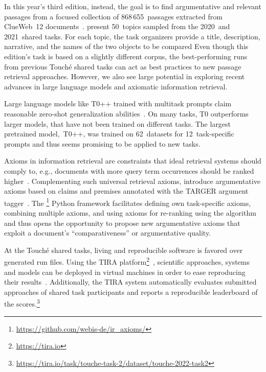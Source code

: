 In this year's third edition, instead, the goal is to find argumentative and relevant passages from a focused collection of 868\,655~passages extracted from ClueWeb~12 documents~\cite{BondarenkoFKSGBPBSWPH2022}.
\citeauthor{BondarenkoFKSGBPBSWPH2022} present 50~topics sampled from the 2020~and 2021~shared tasks. 
For each topic, the task organizers provide a title, description, narrative, and the names of the two objects to be compared
Even though this edition's task is based on a slightly different corpus, the best-performing runs from previous Touché shared tasks can act as best practices to new passage retrieval approaches.
However, we also see large potential in exploring recent advances in large language models and axiomatic information retrieval.

Large language models like T0++ trained with multitask prompts claim reasonable zero-shot generalization abilities~\cite{SanhWRBSACSLRDBXTSSKCNDCJWMSYPBWNRSSFFTBGBWR2021}.
On many tasks, T0 outperforms larger models, that have not been trained on different tasks. The largest pretrained model,~T0++, was trained on 62~datasets for 12~task-specific prompts and thus seems promising to be applied to new tasks.

Axioms in information retrieval are constraints that ideal retrieval systems should comply to, e.g., documents with more query term occurrences should be ranked higher~\citet{FangTZ2004}.
Complementing such universal retrieval axioms, \citet{BondarenkoHVSPB2018} introduce argumentative axioms based on claims and premises annotated with the TARGER argument tagger~\cite{ChernodubOHBHBP2019}.
The \iraxioms\footnote{\url{https://github.com/webis-de/ir_axioms/}} Python framework facilitates defining own task-specific axioms, combining multiple axioms, and using axioms for re-ranking using the \KwikSort algorithm~\cite{BondarenkoFRSVH2022,HagenVGS2016} and thus opens the opportunity to propose new argumentative axioms that exploit a document's ``comparativeness'' or argumentative quality.

At the Touché shared tasks, living and reproducible software is favored over generated run files.
Using the TIRA platform\footnote{\url{https://tira.io}}~\cite{PotthastGWS2019}, scientific approaches, systems and models can be deployed in virtual machines in order to ease reproducing their results~\cite{PotthastGWS2019}.
Additionally, the TIRA system automatically evaluates submitted approaches of shared task participants and reports a reproducible leaderboard of the  scores.\footnote{\url{https://tira.io/task/touche-task-2/dataset/touche-2022-task2}}
